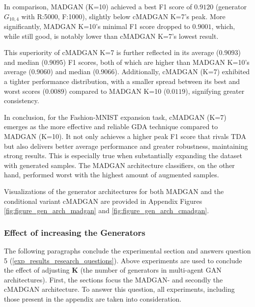 In comparison, MADGAN (K=10) achieved a best F1 score of $0.9120$ (generator \(G_{10,4}\) with R:5000, F:1000), slightly below cMADGAN K=7's peak. More significantly, MADGAN K=10's minimal F1 score dropped to $0.9001$, which, while still good, is notably lower than cMADGAN K=7's lowest result.

This superiority of cMADGAN K=7 is further reflected in its average ($0.9093$) and median ($0.9095$) F1 scores, both of which are higher than MADGAN K=10's average ($0.9060$) and median ($0.9066$). Additionally, cMADGAN (K=7) exhibited a tighter performance distribution, with a smaller spread between its best and worst scores ($0.0089$) compared to MADGAN K=10 ($0.0119$), signifying greater consistency.

In conclusion, for the Fashion-MNIST expansion task, cMADGAN (K=7) emerges as the more effective and reliable GDA technique compared to MADGAN (K=10). It not only achieves a higher peak F1 score that rivals TDA but also delivers better average performance and greater robustness, maintaining strong results. This is especially true when substantially expanding the dataset with generated samples. The MADGAN architecture classifiers, on the other hand, performed worst with the highest amount of augmented samples.

Visualizations of the generator architectures for both MADGAN and the conditional variant cMADGAN are provided in Appendix Figures \ref{fig:figure_gen_arch_madgan} and \ref{fig:figure_gen_arch_cmadgan}.

\subsubsection[Question 5]{Effect of increasing the Generators}            \label{exp_results_ans_q5}
The following paragraphs conclude the experimental section and answers question 5 (\ref{exp_results_research_questions}). Above experiments are used to conclude the effect of adjusting \textbf{K} (the number of generators in multi-agent GAN architectures). First, the sections focus the MADGAN- and secondly the cMADGAN architecture. To answer this question, all experiments, including those present in the appendix are taken into consideration.


